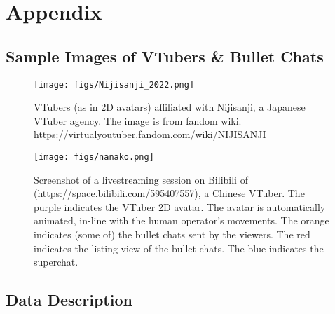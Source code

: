 \section{Appendix}

\subsection{Sample Images of VTubers \& Bullet Chats}

\begin{figure}[h!]
    \centering
    \texttt{[image: figs/Nijisanji\_2022.png]}
    \caption{VTubers (as in 2D avatars) affiliated with Nijisanji, a Japanese VTuber agency. The image is from fandom wiki. \url{https://virtualyoutuber.fandom.com/wiki/NIJISANJI}}
    \label{fig:nijisanji}
\end{figure}

\begin{figure}[h!]
    \centering
    \texttt{[image: figs/nanako.png]}
    \caption{Screenshot of a livestreaming session on Bilibili of  (\url{https://space.bilibili.com/595407557}), a Chinese VTuber. The purple indicates the VTuber 2D avatar. The avatar is automatically animated, in-line with the human operator's movements. The orange indicates (some of) the bullet chats sent by the viewers. The red indicates the listing view of the bullet chats. The blue indicates the superchat.}
    \label{fig:nanako}
\end{figure}

\newpage

\subsection{Data Description}
\label{subsec:appendix_data_description}


